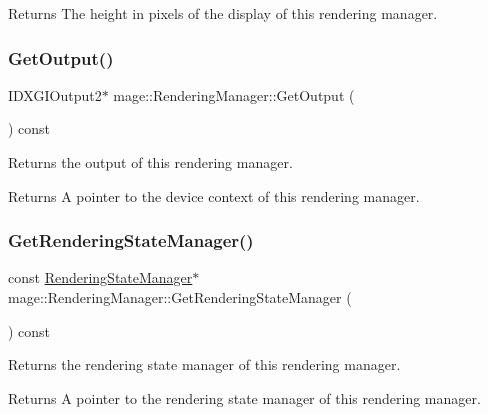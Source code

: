 \begin{DoxyReturn}{Returns}
The height in pixels of the display of this rendering manager. 
\end{DoxyReturn}
\hypertarget{classmage_1_1_rendering_manager_afc4c28f24e25635c305fd7709acf4e7f}{}\label{classmage_1_1_rendering_manager_afc4c28f24e25635c305fd7709acf4e7f} 
\subsubsection{\texorpdfstring{Get\+Output()}{GetOutput()}}
{\footnotesize\ttfamily I\+D\+X\+G\+I\+Output2$\ast$ mage\+::\+Rendering\+Manager\+::\+Get\+Output (\begin{DoxyParamCaption}{ }\end{DoxyParamCaption}) const\hspace{0.3cm}{\ttfamily [noexcept]}}

Returns the output of this rendering manager.

\begin{DoxyReturn}{Returns}
A pointer to the device context of this rendering manager. 
\end{DoxyReturn}
\hypertarget{classmage_1_1_rendering_manager_a762283c6474287a874f8e8667f69a165}{}\label{classmage_1_1_rendering_manager_a762283c6474287a874f8e8667f69a165} 
\subsubsection{\texorpdfstring{Get\+Rendering\+State\+Manager()}{GetRenderingStateManager()}}
{\footnotesize\ttfamily const \hyperlink{structmage_1_1_rendering_state_manager}{Rendering\+State\+Manager}$\ast$ mage\+::\+Rendering\+Manager\+::\+Get\+Rendering\+State\+Manager (\begin{DoxyParamCaption}{ }\end{DoxyParamCaption}) const\hspace{0.3cm}{\ttfamily [noexcept]}}

Returns the rendering state manager of this rendering manager.

\begin{DoxyReturn}{Returns}
A pointer to the rendering state manager of this rendering manager. 
\end{DoxyReturn}
\hypertarget{classmage_1_1_rendering_manager_a5ac88f86f2fe4ad4d13a5c3c4f0c4465}{}\label{classmage_1_1_rendering_manager_a5ac88f86f2fe4ad4d13a5c3c4f0c4465} 
